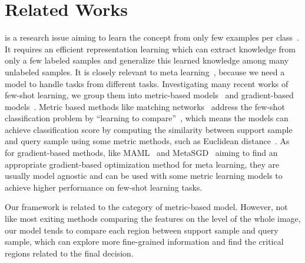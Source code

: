 \documentclass[letterpaper]{article}
\begin{document}
\section{Related Works}
 is a research issue aiming to learn the concept from only few examples per class~\cite{lake2011one}. It requires an efficient representation learning which can extract knowledge from only a few labeled samples and generalize this learned knowledge among many unlabeled samples. It is closely relevant to meta learning~\cite{metagan,hou2019cross}, because we need a model to handle tasks from different tasks. Investigating many recent works of few-shot learning, we group them into metric-based models~\cite{koch2015siamese,VinyalsMatching,snell2017prototypical,sung2018learning} and gradient-based models~\cite{finn2017model,ravi2016optimization,LiMeta}. Metric based methods like matching networks~\cite{VinyalsMatching} address the few-shot classification problem by “learning to compare”~\cite{chen2019closerfewshot}, which means the models can achieve classification score by computing the similarity between support sample and query sample using some metric methods, such as Euclidean distance~\cite{snell2017prototypical}. As for gradient-based methods, like MAML~\cite{finn2017model} and MetaSGD~\cite{LiMeta} aiming to find an appropriate gradient-based optimization method for meta learning, they are usually model agnostic and can be used with some metric learning models to achieve higher performance on few-shot learning tasks.   

Our framework is related to the category of metric-based model. However, not like most exiting methods comparing the features on the level of the whole image, our model tends to compare each region between support sample and query sample, which can explore more fine-grained information and find the critical regions related to the final decision.      
\end{document}
